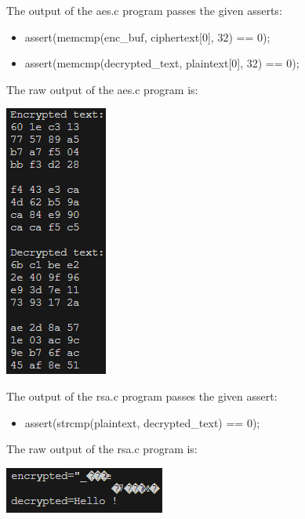 The output of the aes.c program passes the given asserts:
\begin{itemize}
    \item assert(memcmp(enc\_buf, ciphertext[0], 32) == 0);
	\item assert(memcmp(decrypted\_text, plaintext[0], 32) == 0);
\end{itemize}

The raw output of the aes.c program is:

\graphicspath{{./}}
\includegraphics*[scale=1]{aes_output.png}

The output of the rsa.c program passes the given assert:
\begin{itemize}
    \item assert(strcmp(plaintext, decrypted\_text) == 0);
\end{itemize}

The raw output of the rsa.c program is:

\graphicspath{{./}}
\includegraphics*[scale=1]{rsa_output.png}